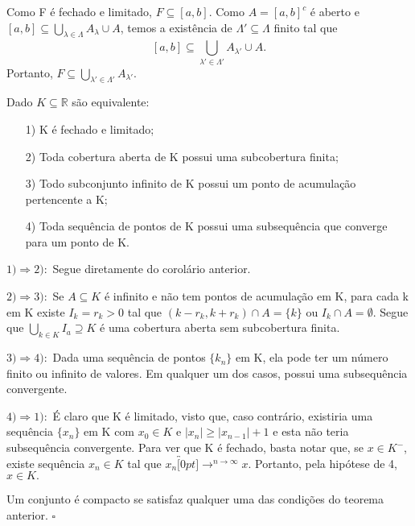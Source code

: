 \documentclass[Analysis/analysis_notes.tex]{subfiles}
\begin{document}
\begin{proof*}
	Como F é fechado e limitado, $F\subseteq{[a,b]}$. Como $A=[a,b]^{c}$ é aberto e $[a,b]\subseteq{\bigcup_{\lambda \in\Lambda }^{}{A_{\lambda }}\cup{A}}$, temos
	a existência de $\Lambda '\subseteq{\Lambda }$ finito tal que
	$$
		[a,b] \subseteq{\bigcup_{\lambda '\in\Lambda '}^{}{A_{\lambda '}}\cup{A}}.
	$$
	Portanto, $F\subseteq{\bigcup_{\lambda '\in\Lambda '}^{}{A_{\lambda '}}}.$ \qedsymbol
\end{proof*}
\begin{theorem*}
	Dado $K\subseteq{\mathbb{R}}$ são equivalente:
	\begin{itemize}
		\item[1)] K é fechado e limitado;
		\item[2)] Toda cobertura aberta de K possui uma subcobertura finita;
		\item[3)] Todo subconjunto infinito de K possui um ponto de acumulação pertencente a K;
		\item[4)] Toda sequência de pontos de K possui uma subsequência que converge para um ponto de K.
	\end{itemize}
\end{theorem*}
\begin{proof*}
	$1) \Rightarrow 2):$ Segue diretamente do corolário anterior.

	$2) \Rightarrow 3):$ Se $A\subseteq{K}$ é infinito e não tem pontos de acumulação em K, para cada k em K existe $I_{k}=r_{k} > 0$
	tal que $(k-r_{k}, k+r_{k})\cap{A} = \{k\}$ ou  $I_{k}\cap A = \emptyset.$ Segue que $\bigcup_{k\in K}^{}{I_{a}}\supseteq{K}$ é
	uma cobertura aberta sem subcobertura finita.

	$3) \Rightarrow 4):$ Dada uma sequência de pontos $\{k_{n}\}$ em K, ela pode ter um número finito ou infinito de valores.
	Em qualquer um dos casos, possui uma subsequência convergente.

	$4) \Rightarrow 1):$ É claro que K é limitado, visto que, caso contrário, existiria uma sequência $\{x_{n}\}$ em K com $x_{0}\in K$
	e $|x_{n}|\geq |x_{n-1}| + 1$ e esta não teria subsequência convergente. Para ver que K é fechado, basta notar que, se $x\in K^{-}$,
	existe sequência $x_{n}\in K$ tal que $x_{n}\overbracket[0pt]{\longrightarrow}^{n\to \infty}x$. Portanto, pela hipótese de 4, $x\in K.$\qedsymbol
\end{proof*}
\begin{def*}
	Um conjunto é compacto se satisfaz qualquer uma das condições do teorema anterior. $\square$
\end{def*}
\end{document}
